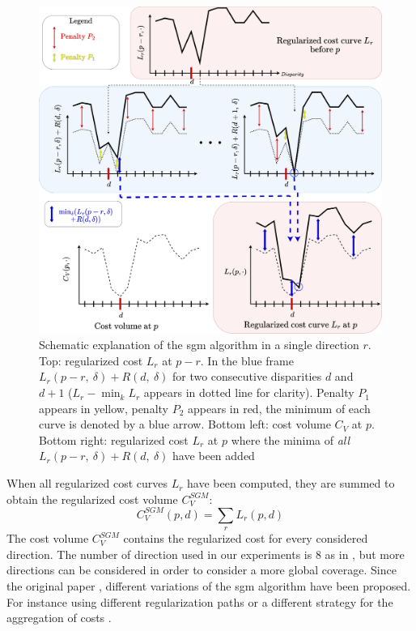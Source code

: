 \begin{figure}
	\centering
	\includegraphics[width=\linewidth]{Images/Chap_1/SGM.png}
	\caption{Schematic explanation of the \acrshort{sgm} algorithm in a single direction $r$. Top: regularized cost $L_r$ at $p-r$. In the blue frame $L_r(p-r,~\delta)+R(d,~\delta)$ for two consecutive disparities $d$ and $d+1$ ($L_r-\min_k L_r$ appears in dotted line for clarity). Penalty $P_1$ appears in yellow, penalty $P_2$ appears in red, the minimum of each curve is denoted by a blue arrow. Bottom left: cost volume $C_V$ at $p$. Bottom right: regularized cost $L_r$ at $p$ where the minima of \textit{all} $L_r(p-r,~\delta)+R(d,~\delta)$ have been added}
	\label{fig:sgm}
\end{figure}

When all regularized cost curves $L_r$ have been computed, they are summed to obtain the regularized cost volume $C_V^{SGM}$:
\begin{equation}
    C_V^{SGM}(p, d) = \sum_r L_r(p,d)
\end{equation}
The cost volume $C^{SGM}_V$ contains the regularized cost for every  considered direction. The number of direction used in our experiments is 8 as in , but more directions can be considered in order to consider a more global coverage. Since the original paper \cite{hirschmuller_accurate_2005}, different variations of the \acrshort{sgm} algorithm have been proposed. For instance using different regularization paths \cite{facciolo_mgm_2015} or a different strategy for the aggregation of costs \cite{poggi_learning_2016}.

